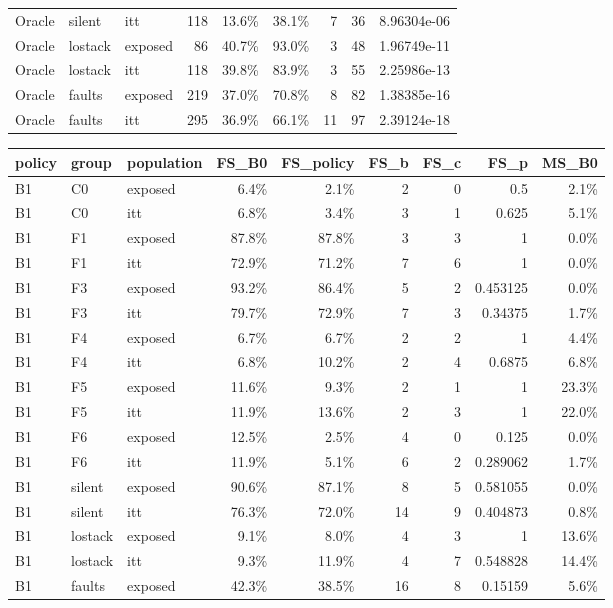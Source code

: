 \begin{tabular}{lllrrrrrr}
Oracle & silent & itt & 118 & 13.6\% & 38.1\% & 7 & 36 & 8.96304e-06 \\
Oracle & lostack & exposed & 86 & 40.7\% & 93.0\% & 3 & 48 & 1.96749e-11 \\
Oracle & lostack & itt & 118 & 39.8\% & 83.9\% & 3 & 55 & 2.25986e-13 \\
Oracle & faults & exposed & 219 & 37.0\% & 70.8\% & 8 & 82 & 1.38385e-16 \\
Oracle & faults & itt & 295 & 36.9\% & 66.1\% & 11 & 97 & 2.39124e-18 \\
\bottomrule
\end{tabular}

\begin{tabular}{lllrrrrrr}
\toprule
policy & group & population & FS\_B0 & FS\_policy & FS\_b & FS\_c & FS\_p & MS\_B0 \\
\midrule
B1 & C0 & exposed & 6.4\% & 2.1\% & 2 & 0 & 0.5 & 2.1\% \\
B1 & C0 & itt & 6.8\% & 3.4\% & 3 & 1 & 0.625 & 5.1\% \\
B1 & F1 & exposed & 87.8\% & 87.8\% & 3 & 3 & 1 & 0.0\% \\
B1 & F1 & itt & 72.9\% & 71.2\% & 7 & 6 & 1 & 0.0\% \\
B1 & F3 & exposed & 93.2\% & 86.4\% & 5 & 2 & 0.453125 & 0.0\% \\
B1 & F3 & itt & 79.7\% & 72.9\% & 7 & 3 & 0.34375 & 1.7\% \\
B1 & F4 & exposed & 6.7\% & 6.7\% & 2 & 2 & 1 & 4.4\% \\
B1 & F4 & itt & 6.8\% & 10.2\% & 2 & 4 & 0.6875 & 6.8\% \\
B1 & F5 & exposed & 11.6\% & 9.3\% & 2 & 1 & 1 & 23.3\% \\
B1 & F5 & itt & 11.9\% & 13.6\% & 2 & 3 & 1 & 22.0\% \\
B1 & F6 & exposed & 12.5\% & 2.5\% & 4 & 0 & 0.125 & 0.0\% \\
B1 & F6 & itt & 11.9\% & 5.1\% & 6 & 2 & 0.289062 & 1.7\% \\
B1 & silent & exposed & 90.6\% & 87.1\% & 8 & 5 & 0.581055 & 0.0\% \\
B1 & silent & itt & 76.3\% & 72.0\% & 14 & 9 & 0.404873 & 0.8\% \\
B1 & lostack & exposed & 9.1\% & 8.0\% & 4 & 3 & 1 & 13.6\% \\
B1 & lostack & itt & 9.3\% & 11.9\% & 4 & 7 & 0.548828 & 14.4\% \\
B1 & faults & exposed & 42.3\% & 38.5\% & 16 & 8 & 0.15159 & 5.6\% \\

\end{tabular}
